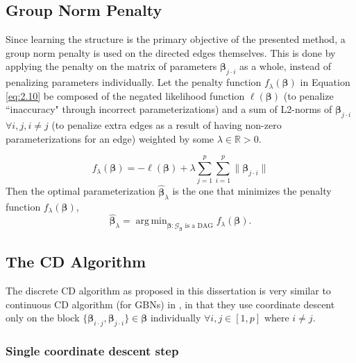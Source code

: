 \documentclass[twoside,11pt]{article}
\DeclareMathOperator*{\argmin}{arg\,min}
\newcommand{\reals}{\mathbb{R}}
\let\mc\mathcal
\begin{document}
\subsection{Group Norm Penalty}

Since learning the structure is the primary objective of the presented method, a group norm penalty is used on the directed edges themselves. This is done by applying the penalty on the matrix of parameters $\bm\beta_{j\cdot i}$ as a whole, instead of penalizing parameters individually. Let the penalty function $f_\lambda(\bm\beta)$ in Equation \eqref{eq:2.10} be composed of the negated likelihood function $\ell(\bm\beta)$ (to penalize ``inaccuracy" through incorrect parameterizations) and a sum of L2-norms of $\bm\beta_{j\cdot i}$ $\forall{i,j},i\neq j$ (to penalize extra edges as a result of having non-zero parameterizations for an edge) weighted by some $\lambda\in\reals>0$.

\begin{equation}
    f_\lambda(\bm\beta) = -\ell(\bm\beta)+\lambda\sum_{j=1}^{p}\sum_{i=1}^{p}\lVert\bm\beta_{j\cdot i}\rVert \label{eq:2.10}
\end{equation}
Then the optimal parameterization $\hat{\bm\beta}_\lambda$ is the one that minimizes the penalty function $f_\lambda(\bm\beta)$,
\begin{equation*}
    \hat{\bm\beta}_\lambda=\argmin_{\bm\beta:\mc G_{\bm\beta}\text{ is a DAG}}{f_\lambda(\bm\beta)}.
\end{equation*}

\subsection{The CD Algorithm}

The discrete CD algorithm as proposed in this dissertation is very similar to continuous CD algorithm (for GBNs) in \cite{zhou}, in that they use coordinate descent only on the block $\{\bm{\beta}_{i\cdot j},\bm{\beta}_{j\cdot i}\}\in\bm{\beta}$ individually $\forall{i,j}\in[1,p]$ where $i\neq j$.

\subsubsection{Single coordinate descent step}
\end{document}
